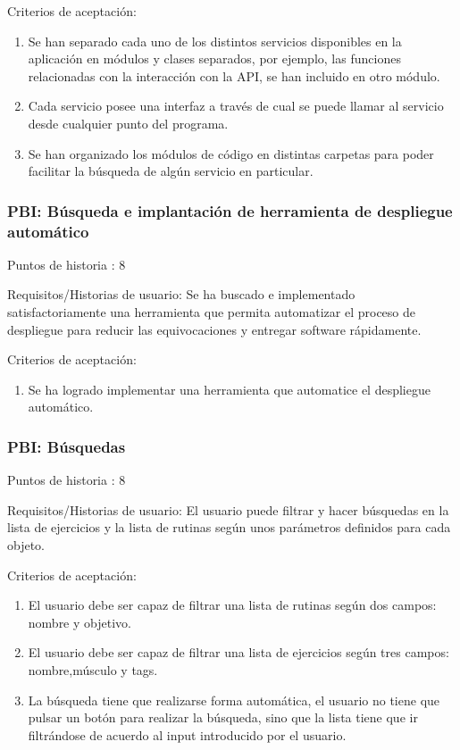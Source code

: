 \documentclass[11pt,a4paper]{report}
\begin{document}
Criterios de aceptación:
\begin{enumerate}
	\item Se han separado cada uno de los distintos servicios disponibles en la aplicación en módulos y clases separados, por ejemplo, las funciones relacionadas con la interacción con la API, se han incluido en otro módulo.
	
	\item Cada servicio posee una interfaz a través de cual se puede llamar al servicio desde cualquier punto del programa.
	
	\item Se han organizado los módulos de código en distintas carpetas para poder facilitar la búsqueda de algún servicio en particular.
	
\end{enumerate}
\subsubsection{PBI: Búsqueda e implantación de herramienta de despliegue automático}
Puntos de historia : 8

Requisitos/Historias de usuario: Se ha buscado e implementado satisfactoriamente una herramienta que permita automatizar el proceso de despliegue para reducir las equivocaciones y entregar software rápidamente.

Criterios de aceptación:
\begin{enumerate}
	\item Se ha logrado implementar una herramienta que automatice el despliegue automático.
\end{enumerate}
\subsubsection{PBI: Búsquedas}
Puntos de historia : 8

Requisitos/Historias de usuario: El usuario puede filtrar y hacer búsquedas en la lista de ejercicios y la lista de rutinas según unos parámetros definidos para cada objeto.

Criterios de aceptación:
\begin{enumerate}
	\item El usuario debe ser capaz de filtrar una lista de rutinas según dos campos: nombre y objetivo.
	
	\item El usuario debe ser capaz de filtrar una lista de ejercicios según tres campos: nombre,músculo y tags.
	
	\item La búsqueda tiene que realizarse forma automática, el usuario no tiene que pulsar un botón para realizar la búsqueda, sino que la lista tiene que ir filtrándose de acuerdo al input introducido por el usuario.
	
\end{enumerate}
\end{document}
